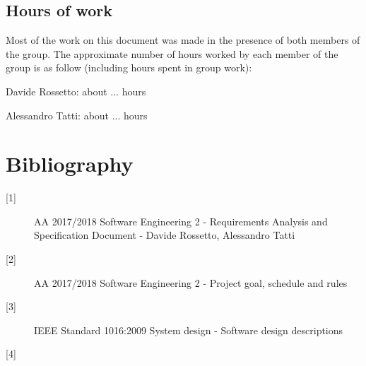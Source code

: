 \documentclass{article}
\begin{document}
	\subsection{Hours of work}

	Most of the work on this document was made in the presence of both members of the group. The approximate number of hours worked by each member of the group is as follow (including hours spent in group work):
	
	\bigskip
	Davide Rossetto: about ... hours
	
	Alessandro Tatti: about ... hours

	
	\section{Bibliography}
	
	\begin{description}
	\item [[1{]}] AA 2017/2018 Software Engineering 2 - Requirements Analysis and Specification Document - Davide Rossetto, Alessandro Tatti
	\item [[2{]}] AA 2017/2018 Software Engineering 2 - Project goal, schedule and rules
	\item [[3{]}] IEEE Standard 1016:2009 System design - Software design descriptions
	\item [[4{]}]
	\end{description}
\end{document}
